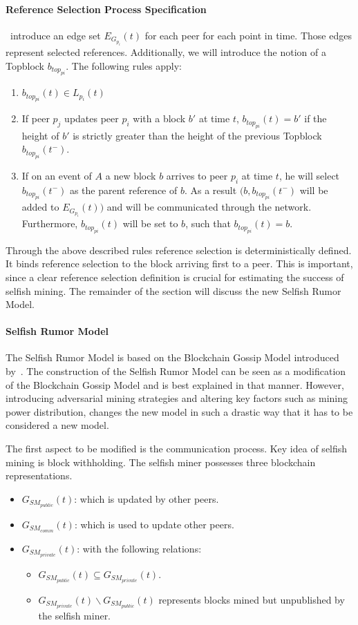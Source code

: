 \paragraph{Reference Selection Process Specification}
~introduce an edge set $E_{G_{p_i}}(t)$ for each peer for each point in time. Those edges represent selected references.
Additionally, we will introduce the notion of a Topblock $b_{{top}_{pi}}$.
The following rules apply:
\begin{enumerate}
\item $b_{{top}_{pi}}(t) \in L_{p_i}(t)$
\item If peer $p_j$ updates peer $p_i$ with a block $b'$ at time $t$, $b_{{top}_{pi}}(t) = b'$ if the height of $b'$ is strictly greater than the height of the previous Topblock $b_{{top}_{pi}}(t^-)$.
\item If on an event of $A$ a new block $b$ arrives to peer $p_i$ at time $t$, he will select $b_{{top}_{pi}}(t^-)$ as the parent reference of $b$. As a result $(b,b_{{top}_{pi}}(t^-)$ will be added to $E_{G_{p_i}}(t))$ and will be communicated through the network. Furthermore, $b_{{top}_{pi}}(t)$ will be set to $b$, such that $b_{{top}_{pi}}(t) = b$.
\end{enumerate} 
Through the above described rules reference selection is deterministically defined. It binds reference selection to the block arriving first to a peer. This is important, since a clear reference selection definition is crucial for estimating the success of selfish mining. The remainder of the section will discuss the new Selfish Rumor Model.

\paragraph{Selfish Rumor Model}
The Selfish Rumor Model is based on the Blockchain Gossip Model introduced by~. The construction of the Selfish Rumor Model can be seen as a modification of the Blockchain Gossip Model and is best explained in that manner. However, introducing adversarial mining strategies and altering key factors such as mining power distribution, changes the new model in such a drastic way that it has to be considered a new model.

The first aspect to be modified is the communication process. 
Key idea of selfish mining is block withholding. The selfish miner possesses three blockchain representations. 
\begin{itemize}
\item $G_{SM_{public}}(t)$: which is updated by other peers.
\item $G_{SM_{comm}}(t)$: which is used to update other peers.
\item $G_{SM_{private}}(t)$: with the following relations:
		\begin{itemize}
		\item $G_{SM_{public}}(t)\subseteq G_{SM_{private}}(t)$.
		\item $G_{SM_{private}}(t)\backslash G_{SM_{public}}(t)$ represents blocks mined but unpublished by the selfish miner.
\end{itemize}		
\end{itemize}


